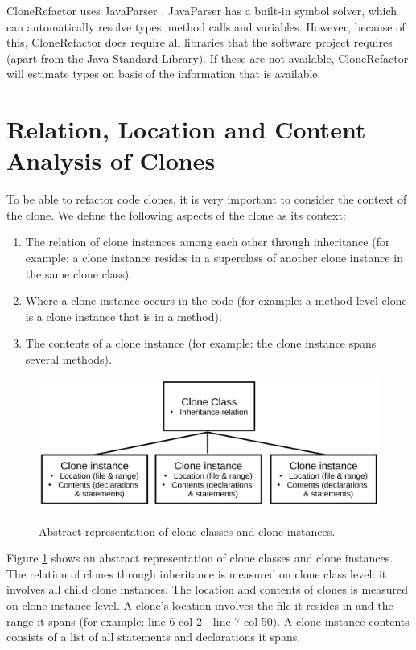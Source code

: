 \documentclass[a4paper]{article}
\begin{document}
CloneRefactor uses JavaParser \cite{tomassetti2017javaparser}. JavaParser has a built-in symbol solver, which can automatically resolve types, method calls and variables. However, because of this, CloneRefactor does require all libraries that the software project requires (apart from the Java Standard Library). If these are not available, CloneRefactor will estimate types on basis of the information that is available.

\section{Relation, Location and Content Analysis of Clones}\label{chap:clonecontextexpl}
To be able to refactor code clones, it is very important to consider the context of the clone. We define the following aspects of the clone as its context:
\begin{enumerate}
  \item The relation of clone instances among each other through inheritance (for example: a clone instance resides in a superclass of another clone instance in the same clone class).
  \item Where a clone instance occurs in the code (for example: a method-level clone is a clone instance that is in a method).
  \item The contents of a clone instance (for example: the clone instance spans several methods).
\end{enumerate}

\begin{figure}[H]
  \caption{Abstract representation of clone classes and clone instances.}
    \medskip
    \includegraphics[width=1\columnwidth]{img/context}
  \label{fig:clonecontext}
\end{figure}

Figure \ref{fig:clonecontext} shows an abstract representation of clone classes and clone instances. The relation of clones through inheritance is measured on clone class level: it involves all child clone instances. The location and contents of clones is measured on clone instance level. A clone's location involves the file it resides in and the range it spans (for example: line 6 col 2 - line 7 col 50). A clone instance contents consists of a list of all statements and declarations it spans.
\end{document}
